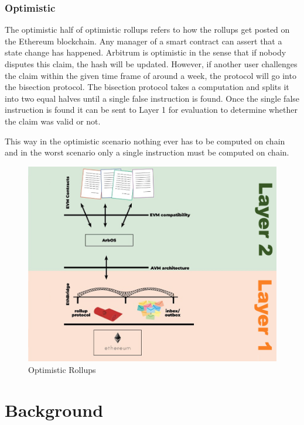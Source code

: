 \documentclass[a4paper,oneside,openright,11pt]{report}
\begin{document}
\subsection{Optimistic}
The optimistic half of optimistic rollups refers to how the rollups get posted on the Ethereum blockchain.
Any manager of a smart contract can assert that a state change has happened. Arbitrum is optimistic in
the sense that if nobody disputes this claim, the hash will be updated. However, if another user challenges
the claim within the given time frame of around a week, the protocol will go into the bisection protocol.
The bisection protocol takes a computation and splits it into two equal halves until a single false instruction 
is found. Once the single false instruction is found it can be sent to Layer 1 for evaluation to determine whether
the claim was valid or not.

This way in the optimistic scenario nothing ever has to be computed on chain and in the worst scenario only a single instruction
must be computed on chain.

\begin{figure}[h]
	\centering
	\includegraphics[scale=0.5]{./Pictures/Optimistic-Rollup.png}
	\caption{Optimistic Rollups}
	\label{fig:Optimistic_Rollups}
\end{figure}
  
\chapter{Background}
\end{document}
